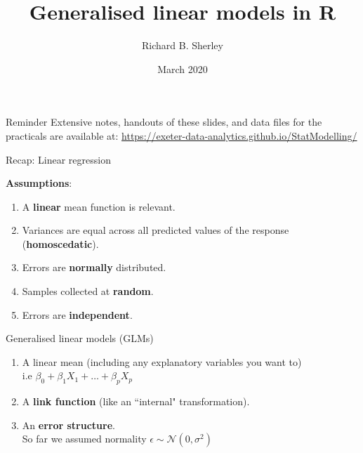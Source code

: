 \documentclass[pdf,handout]{beamer}
\title[GLMs in R]{Generalised linear models in R}
\author{Richard B. Sherley}
\date[March 2020]{March 2020}
\institute[]{University of Exeter, Penryn Campus, UK}
\begin{document}
\begin{frame}
\titlepage
\end{frame}

\begin{frame}{Reminder}
Extensive notes, handouts of these slides, and data files for the practicals are available at: 
\href{https://exeter-data-analytics.github.io/StatModelling/}{https://exeter-data-analytics.github.io/StatModelling/}
\end{frame}
\begin{frame}{Recap: Linear regression}

\textbf{Assumptions}:

\begin{enumerate}\addtolength{\itemsep}{1\baselineskip}
    \item A \textbf{linear} mean function is relevant.
    \item Variances are equal across all predicted values of the response (\textbf{homoscedatic}).
    \item Errors are \textbf{normally} distributed. 
    \item Samples collected at \textbf{random}.
    \item Errors are \textbf{independent}.
\end{enumerate}

\end{frame}

\begin{frame}{Generalised linear models (GLMs)}

\begin{enumerate}\addtolength{\itemsep}{2\baselineskip}
    \item A linear mean (including any explanatory variables you want to)\\ i.e $\beta_0 + \beta_1X_1 + \ldots + \beta_pX_p$
    \item A \textbf{link function} (like an ``internal" transformation).
    \item An \textbf{error structure}.\\ So far we assumed normality $\epsilon \sim \mathcal{N}(0,\sigma^2)$
\end{enumerate}

\end{frame}
\end{document}
